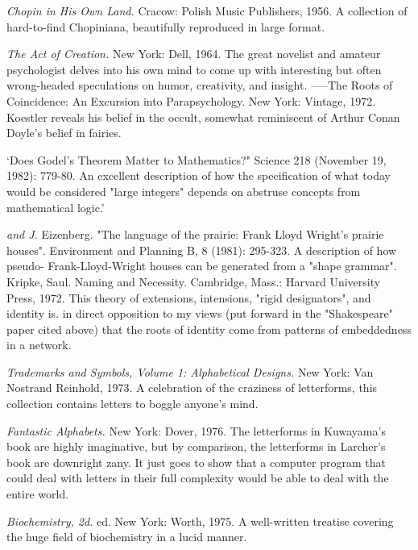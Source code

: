  {\sl Chopin in His Own Land.} Cracow: Polish Music Publishers, 1956. A collection of hard-to-find Chopiniana, beautifully reproduced in large format.

 {\sl The Act of Creation.} New York: Dell, 1964. The great novelist and amateur psychologist delves into his own mind to come up with interesting but often wrong-headed speculations on humor, creativity, and insight. -----The Roots of Coincidence: An Excursion into Parapsychology. New York: Vintage, 1972. Koestler reveals his belief in the occult, somewhat reminiscent of Arthur Conan Doyle's belief in fairies.

 `Does Godel's Theorem Matter to Mathematics?" Science 218 (November 19, 1982): 779-80. An excellent description of how the specification of what today would be considered "large integers" depends on abstruse concepts from mathematical logic.' 

 {\sl and J.} Eizenberg. "The language of the prairie: Frank Lloyd Wright's prairie houses". Environment and Planning B, 8 (1981): 295-323. A description of how pseudo- Frank-Lloyd-Wright houses can be generated from a "shape grammar". Kripke, Saul. Naming and Necessity. Cambridge, Mass.: Harvard University Press, 1972. This theory of extensions, intensions, "rigid designators", and identity is. in direct opposition to my views (put forward in the "Shakespeare" paper cited above) that the roots of identity come from patterns of embeddedness in a network.

 {\sl Trademarks and Symbols, Volume 1: Alphabetical Designs.} New York: Van Nostrand Reinhold, 1973. A celebration of the craziness of letterforms, this collection contains letters to boggle anyone's mind.

 {\sl Fantastic Alphabets.} New York: Dover, 1976. The letterforms in Kuwayama's book are highly imaginative, but by comparison, the letterforms in Larcher's book are downright zany. It just goes to show that a computer program that could deal with letters in their full complexity would be able to deal with the entire world.

 {\sl Biochemistry, 2d.} ed. New York: Worth, 1975. A well-written treatise covering the huge field of biochemistry in a lucid manner.

